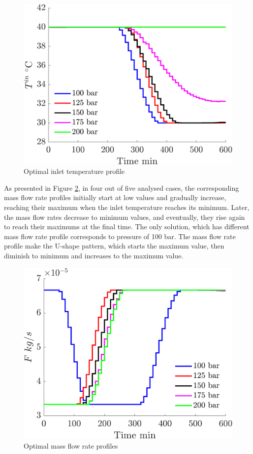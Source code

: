\documentclass[../Article_Sensitivity_Analsysis.tex]{subfiles}
\begin{document}
	\begin{figure}[h!]
		\centering
		\includegraphics[width=\columnwidth]{Figures/Results/Profile_T.png}	
		\caption{Optimal inlet temperature profile}
		\label{fig:profiles_T}
	\end{figure}
	
	As presented in Figure \ref{fig:profiles_F}, in four out of five analysed cases, the corresponding mass flow rate profiles initially start at low values and gradually increase, reaching their maximum when the inlet temperature reaches its minimum. Later, the mass flow rates decrease to minimum values, and eventually, they rise again to reach their maximums at the final time. The only solution, which has different mass flow rate profile corresponds to pressure of 100 bar. The mass flow rate profile make the U-shape pattern, which starts the maximum value, then diminish to minimum and increases to the maximum value.
	
	\begin{figure}[h!]
		\centering
		\includegraphics[width=\columnwidth]{Figures/Results/Profile_F.png}	
		\caption{Optimal mass flow rate profiles}
		\label{fig:profiles_F}
	\end{figure}
	
\end{document}
